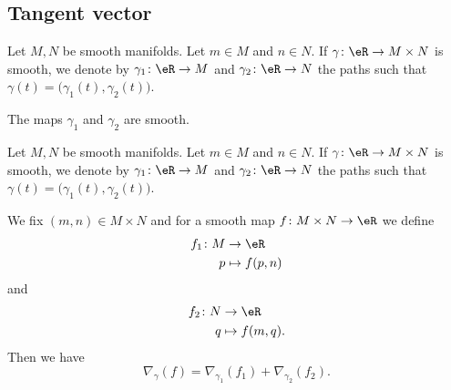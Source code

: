 \subsection{Tangent vector}

\begin{lemma}	\label{LEMooYUUCooDsSyuO}
	Let \( M,N\) be smooth manifolds. Let \( m\in M\) and \( n\in N\). If \(\gamma \colon \eR\to M\times N  \) is smooth, we denote by \(\gamma_1 \colon \eR\to M  \) and \(\gamma_2 \colon \eR\to N  \) the paths such that \( \gamma(t)=\big( \gamma_1(t),\gamma_2(t) \big)\).

	The maps \( \gamma_1\) and \( \gamma_2\) are smooth.
\end{lemma}

\begin{proposition}	\label{PROPooAKWIooGxTwnQ}
	Let \( M,N\) be smooth manifolds. Let \( m\in M\) and \( n\in N\). If \(\gamma \colon \eR\to M\times N  \) is smooth, we denote by \(\gamma_1 \colon \eR\to M  \) and \(\gamma_2 \colon \eR\to N  \) the paths such that \( \gamma(t)=\big( \gamma_1(t),\gamma_2(t) \big)\).

	We fix \( (m,n)\in M\times N\) and for a smooth map \(f \colon M\times N\to \eR  \) we define
	\begin{equation}
		\begin{aligned}
			f_1\colon M & \to \eR        \\
			p           & \mapsto f(p,n)
		\end{aligned}
	\end{equation}
	and \begin{equation}
		\begin{aligned}
			f_2\colon N & \to \eR         \\
			q           & \mapsto f(m,q).
		\end{aligned}
	\end{equation}
	Then we have
	\begin{equation}
		\nabla_{\gamma}(f)=\nabla_{\gamma_1}(f_1)+\nabla_{\gamma_2}(f_2).
	\end{equation}
\end{proposition}

